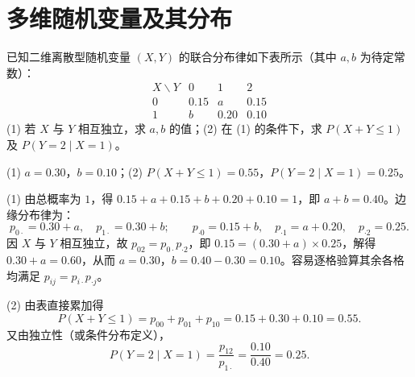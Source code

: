 %
%
\section{多维随机变量及其分布}

\begin{exercise}
已知二维离散型随机变量 $(X,Y)$ 的联合分布律如下表所示（其中 $a,b$ 为待定常数）：
\[
\begin{array}{c|ccc}
  X\backslash Y & 0 & 1 & 2 \\ \hline
  0 & 0.15 & a & 0.15 \\
  1 & b & 0.20 & 0.10
\end{array}
\]
(1) 若 $X$ 与 $Y$ 相互独立，求 $a,b$ 的值；(2) 在 (1) 的条件下，求 $P(X+Y\le 1)$ 及 $P(Y=2\mid X=1)$。
\begin{answer}
(1) $a=0.30$，$b=0.10$；(2) $P(X+Y\le 1)=0.55$，$P(Y=2\mid X=1)=0.25$。
\end{answer}
\begin{solution}
(1) 由总概率为 $1$，得 $0.15+a+0.15+b+0.20+0.10=1$，即 $a+b=0.40$。边缘分布律为：
\[
  p_{0\cdot}=0.30+a,\quad p_{1\cdot}=0.30+b;\qquad
  p_{\cdot 0}=0.15+b,\quad p_{\cdot 1}=a+0.20,\quad p_{\cdot 2}=0.25.
\]
因 $X$ 与 $Y$ 相互独立，故 $p_{02}=p_{0\cdot}p_{\cdot 2}$，即 $0.15=(0.30+a)\times 0.25$，解得 $0.30+a=0.60$，从而 $a=0.30$，$b=0.40-0.30=0.10$。容易逐格验算其余各格均满足 $p_{ij}=p_{i\cdot}p_{\cdot j}$。

(2) 由表直接累加得
\[
  P(X+Y\le 1)=p_{00}+p_{01}+p_{10}=0.15+0.30+0.10=0.55.
\]
又由独立性（或条件分布定义），
\[
  P(Y=2\mid X=1)=\frac{p_{12}}{p_{1\cdot}}=\frac{0.10}{0.40}=0.25.
\]
\end{solution}
\end{exercise}

